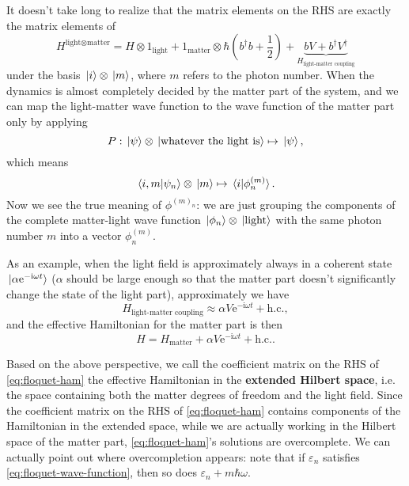 \documentclass[hyperref, a4paper]{article}
\newcommand*{\ii}{\mathrm{i}}
\newcommand*{\ee}{\mathrm{e}}
\newcommand*{\concept}[1]{{\textbf{#1}}}
\begin{document}
It doesn't take long to realize that the matrix elements on the RHS 
are exactly the matrix elements of 
\begin{equation}
    H^{\text{light$\otimes$matter}} = 
    H \otimes 1_{\text{light}} + 1_{\text{matter}} \otimes \hbar \left(
        b^\dagger b + \frac{1}{2} 
    \right) 
    + \underbrace{
        b V + b^\dagger V^\dagger  
    }_{H_{\text{light-matter coupling}}} 
\end{equation}
under the basis $\ket*{i} \otimes \ket*{m}$,
where $m$ refers to the photon number. 
When the dynamics is almost completely decided by the matter part of the system,
and we can map the light-matter wave function 
to the wave function of the matter part only by applying 
\begin{equation}
    P: \ket*{\psi} \otimes \ket*{\text{whatever the light is}} \mapsto \ket*{\psi},
    \label{eq:from-extended-to-matter}
\end{equation} 
which means 
\begin{equation}
    \braket*{i, m}{\psi_n} \otimes \ket*{m} \mapsto \braket*{i}{\phi^{(m)}_n}.
\end{equation}
Now we see the true meaning of $\phi^{(m)_n}$:
we are just grouping the components of the complete matter-light wave function 
$\ket*{\phi_n} \otimes \ket*{\text{light}}$
with the same photon number $m$
into a vector $\phi_n^{(m)}$.

As an example, when the light field is approximately always in a coherent state
$\ket*{\alpha \ee^{- \ii \omega t}}$
($\alpha$ should be large enough so that the matter part 
doesn't significantly change the state of the light part), 
approximately we have 
\begin{equation}
    H_{\text{light-matter coupling}} \approx
    \alpha V \ee^{- \ii \omega t} + \text{h.c.},
\end{equation}
and the effective Hamiltonian for the matter part is then  
\begin{equation}
    H = H_{\text{matter}} + \alpha V \ee^{- \ii \omega t} + \text{h.c.}.
\end{equation}

Based on the above perspective, 
we call the coefficient matrix on the RHS of \eqref{eq:floquet-ham}
the effective Hamiltonian in the \concept{extended Hilbert space}, 
i.e. the space containing both the matter degrees of freedom 
and the light field.
Since the coefficient matrix on the RHS of \eqref{eq:floquet-ham} 
contains components of the Hamiltonian in the extended space, 
while we are actually working in the Hilbert space of the matter part,
\eqref{eq:floquet-ham}'s solutions are overcomplete.
We can actually point out where overcompletion appears:
note that if $\varepsilon_n$ satisfies \eqref{eq:floquet-wave-function},
then so does $\varepsilon_n + m \hbar \omega$.
\end{document}
